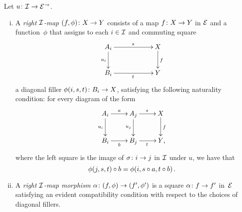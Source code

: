 \documentclass[reqno,10pt,a4paper,oneside,draft]{amsart}
\begin{document}
{{\begin{definition} \label{def:right-map}
Let $u \co \cal{I} \to \catE^\to$.
\begin{enumerate}[(i)]
\item
A \emph{right $\cal{I}$-map} $(f, \phi) \co X \to Y$ consists of a map $f \co X \to Y$ in $\catE$ and a function~$\phi$ that assigns to each $i \in \cal{I}$ and commuting square
\[
\xymatrix@C=2cm{
  A_i
  \ar[r]^{s}
  \ar[d]_{u_i}
&
  X
  \ar[d]^f
\\
  B_i
  \ar[r]_{t}
&
  Y
}
\]
a diagonal filler $\phi(i,s, t) \co B_i \to X$, satisfying the following naturality condition: for every diagram of the form
\[
\xymatrix{
  A_i
  \ar[r]^{a}
  \ar[d]_{u_i}
&
  A_j
  \ar[r]^{s}
  \ar[d]_{u_j}
&
  X
  \ar[d]^f
\\
  B_i
  \ar[r]_{b}
&
  B_j
  \ar[r]_{t}
&
  Y
\rlap{,}}
\]
where the left square is the image of $\sigma \co i \to j$ in $\cal{I}$ under $u$, we have that
\[
\phi(j, s, t) \cc b = \phi(i, s \cc a, t \cc b)
\, .\]
\item
A \emph{right $\cal{I}$-map morphism} $\alpha \co (f, \phi) \to (f', \phi')$ is a square $\alpha \co f \to f'$ in~$\catE$ satisfying an evident compatibility condition with respect to the choices of diagonal fillers.
\end{enumerate}
\end{definition}

}}
\end{document}
